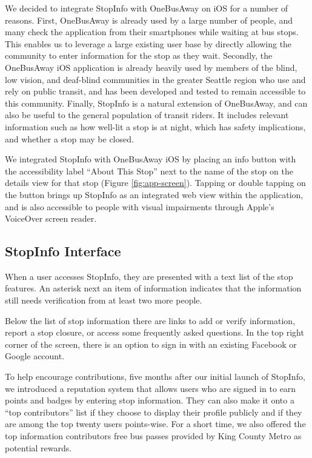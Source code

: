 We decided to integrate StopInfo with OneBusAway on iOS for a number
of reasons. First, OneBusAway is already used by a large number of
people, and many check the application from their smartphones while 
waiting at bus stops. This enables us to leverage a large existing user base by directly allowing the community to enter information for the stop as they 
wait. Secondly, the OneBusAway iOS application is already heavily used 
by members of the blind, low vision, and 
deaf-blind communities in the greater Seattle region who use and rely on
public transit, and has been developed and tested to remain
accessible to this community. Finally, StopInfo is a natural extension of 
OneBusAway, and can also be useful to
the general population of transit riders. It includes relevant information such 
as how well-lit a stop is at night, which has safety implications, and whether
a stop may be closed.

We integrated StopInfo with OneBusAway iOS by placing an info button with the
accessibility label ``About This Stop'' next to the name of the stop on the 
details view for that stop (Figure \ref{fig:app-screen}).  Tapping or double tapping 
on the button brings up StopInfo as an integrated
web view within the application, and is also accessible to people with visual impairments through Apple's
VoiceOver screen reader. 

\pagebreak

\subsection{StopInfo Interface}
When a user accesses StopInfo, they are presented with a text list of the stop features.  
An asterisk next an item of information indicates that the information still needs verification from at least two more people.

Below the list of stop information there are links to add or verify information,
report a stop closure, or access some frequently asked questions. In the top right corner of the screen, there is an option to sign in with an existing Facebook or Google account. 

To help encourage contributions, five months after our initial launch of StopInfo, we introduced a reputation system that allows users who are signed in to earn points and badges by entering stop information. They can also make it onto a ``top contributors'' list if they choose to display their profile publicly and if they are among the top twenty users points-wise. For a short time, we also offered the top information contributors free bus passes provided by King County Metro as potential rewards. 

